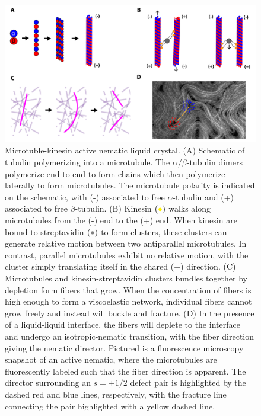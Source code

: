 \begin{figure}
  \centering
  \includegraphics{figures/C3/Ch3-Figs_ActiveBuild.png}
  \caption{Microtuble-kinesin active nematic liquid crystal.
  (A) Schematic of tubulin polymerizing into a microtubule. The $\alpha/\beta$-tubulin dimers polymerize end-to-end to form chains which then polymerize laterally to form microtubules.
  The microtubule polarity is indicated on the schematic, with (-) associated to free $\alpha$-tubulin and (+) associated to free $\beta$-tubulin.
  (B) Kinesin $({\color{yellow} \bullet})$ walks along microtubules from the (-) end to the (+) end.
  When kinesin are bound to streptavidin $({\color{gray} \bullet})$ to form clusters, these clusters can generate relative motion between two antiparallel microtubules.
  In contrast, parallel microtubules exhibit no relative motion, with the cluster simply translating itself in the shared (+) direction.
  (C) Microtubules and kinesin-streptavidin clusters bundles together by depletion form fibers that grow.
  When the concentration of fibers is high enough to form a viscoelastic network, individual fibers cannot grow freely and instead will buckle and fracture.
  (D) In the presence of a liquid-liquid interface, the fibers will deplete to the interface and undergo an isotropic-nematic transition, with the fiber direction giving the nematic director.
  Pictured is a fluorescence microscopy snapshot of an active nematic, where the microtubules are fluorescently labeled such that the fiber direction is apparent.
  The director surrounding an $s = \pm 1/2$ defect pair is highlighted by the dashed red and blue lines, respectively, with the fracture line connecting the pair highlighted with a yellow dashed line.}\label{f:3-ActiveBuild}
\end{figure}

